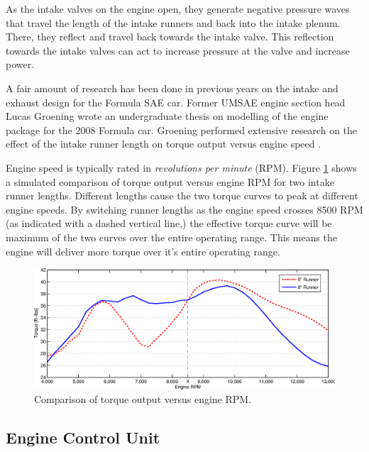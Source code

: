 As the intake valves on the engine open, they generate negative pressure waves that travel the length of the intake runners and back into the intake plenum. There, they reflect and travel back towards the intake valve. This reflection towards the intake valves can act to increase pressure at the valve and increase power.


A fair amount of research has been done in previous years on the intake and exhaust design for the Formula SAE car. Former UMSAE engine section head Lucas Groening wrote an undergraduate thesis on modelling of the engine package for the 2008 Formula car. Groening performed extensive research on the effect of the intake runner length on torque output versus engine speed \cite{LucasIntake}. 

Engine speed is typically rated in \emph{revolutions per minute} (RPM). Figure \ref{fig:irl_effect} shows a simulated comparison of torque output versus engine RPM for two intake runner lengths. Different lengths cause the two torque curves to peak at different engine speeds. By switching runner lengths as the engine speed crosses 8500 RPM (as indicated with a dashed vertical line,) the effective torque curve will be maximum of the two curves over the entire operating range. This means the engine will deliver more torque over it's entire operating range.

\begin{figure}[H]
\centering
\includegraphics[width=6in,keepaspectratio]{background/figures/irl_effect2.eps}
\caption{Comparison of torque output versus engine RPM.}
\label{fig:irl_effect}
\end{figure}

\subsection{Engine Control Unit\label{sec:ECU}}


